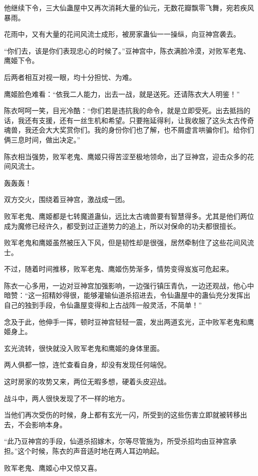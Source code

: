 \begin{this_body}
他继续下令，三大仙蛊屋中又再次消耗大量的仙元，无数花瓣飘零飞舞，宛若疾风暴雨。

花雨中，又有大量的花间风流士成形，被房家蛊仙一一操纵，向豆神宫袭去。

“你们去，该是你们表现忠心的时候了。”豆神宫中，陈衣满脸冷漠，对败军老鬼、鹰姬下令。

后两者相互对视一眼，均十分担忧、为难。

鹰姬脸色难看：“依我二人能力，出去一战，就是送死。还请陈衣大人明鉴！”

陈衣呵呵一笑，目光冷酷：“你们若是违抗我的命令，就是立即受死。出去抵挡的话，我还有支援，还有一丝生机和希望。只要拖延得利，让我收服了这头太古传奇魂兽，我还会大大奖赏你们。我的身份你们也了解，也不屑虚言哄骗你们。给你们俩三息时间，做出决定。”

陈衣相当强势，败军老鬼、鹰姬只得苦涩至极地领命，出了豆神宫，迎击众多的花间风流士。

轰轰轰！

双方交火，围绕着豆神宫，激战成一团。

败军老鬼、鹰姬都是七转魔道蛊仙，远比太古魂兽要有智慧得多。尤其是他们两位成为魔修已经许久，都受到过正道势力的追上，所以对保命的功夫都很擅长。

败军老鬼和鹰姬虽然被压入下风，但是韧性却是很强，居然牵制住了这些花间风流士。

不过，随着时间推移，败军老鬼、鹰姬伤势渐多，情势变得岌岌可危起来。

陈衣一心多用，一边对豆神宫加强影响，一边强行镇压青仇，一边还观战，他心中暗赞：“这一招精妙得很，能够灌输仙道杀招进去，令仙蛊屋中的蛊仙充分发挥出自己的独到手段，令仙蛊屋变得和上古战阵一般灵活，不简单！”

念及于此，他伸手一挥，顿时豆神宫轻轻一震，发出两道玄光，正中败军老鬼和鹰姬身上。

玄光流转，很快就没入败军老鬼和鹰姬的身体里面。

两人俱都一惊，连忙查看自身，却没有发现任何端倪。

这时房家的攻势又来，两位无暇多想，硬着头皮迎战。

战斗中，两人很快发现了不一样的地方。

当他们再次受伤的时候，身上都有玄光一闪，所受到的这些伤害立即就被转移出去，不会影响本身。

“此乃豆神宫的手段，仙道杀招嫁木，尔等尽管施为，所受杀招均由豆神宫承担。”这个时候，陈衣的声音适时地在两人耳边响起。

败军老鬼、鹰姬心中又惊又喜。


\end{this_body}
